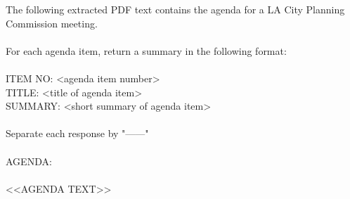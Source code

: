 The following extracted PDF text contains the agenda for a LA City Planning Commission meeting. \\ 
\\ 
For each agenda item, return a summary in the following format:\\ 
\\ 
ITEM NO: <agenda item number>\\ 
TITLE: <title of agenda item>\\ 
SUMMARY: <short summary of agenda item>\\ 
\\ 
Separate each response by "------"\\ 
\\ 
AGENDA:\\ 
\\ 
<<AGENDA TEXT>>
